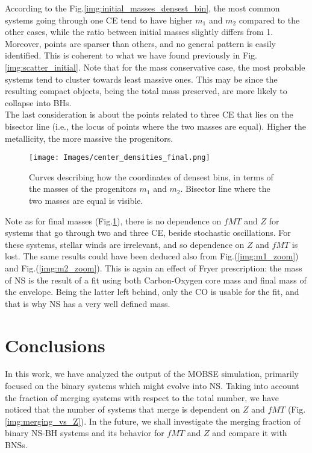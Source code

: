 \documentclass[preprint,12pt]{elsarticle}
\begin{document}
According to the Fig.\ref{img:initial_masses_densest_bin}, the most common systems going through one CE tend to have higher $m_1$ and $m_2$ compared to the other cases, while the ratio between initial masses slightly differs from 1. Moreover, points are sparser than others, and no general pattern is easily identified. This is coherent to what we have found previously in Fig.\ref{img:scatter_initial}. Note that for the mass conservative case, the most probable systems tend to cluster towards least massive ones. This may be since the resulting compact objects, being the total mass preserved, are more likely to collapse into BHs.\\

The last consideration is about the points related to three CE that lies on the bisector line (i.e., the locus of points where the two masses are equal). Higher the metallicity, the more massive the progenitors. 
\\
\begin{figure}[htp]
    \centering
    \texttt{[image: Images/center\_densities\_final.png]}
    \caption{Curves describing how the coordinates of densest bins, in terms of the masses of the progenitors $m_1$ and $m_2$. Bisector line where the two masses are equal is visible.}
    \label{img:final_masses_densest_bin}
  \end{figure}


Note as for final masses (Fig.\ref{img:final_masses_densest_bin}), there is no dependence on $fMT$ and $Z$ for systems that go through two and three CE, beside stochastic oscillations. For these systems, stellar winds are irrelevant, and so dependence on $Z$ and $fMT$ is lost. The same results could have been deduced also from Fig.(\ref{img:m1_zoom}) and Fig.(\ref{img:m2_zoom}). This is again an effect of Fryer prescription: the mass of NS is the result of a fit using both Carbon-Oxygen core mass and final mass of the envelope. Being the latter left behind, only the CO is usable for the fit, and that is why NS has a very well defined mass.\\

\newpage

\section{Conclusions}
In this work, we have analyzed the output of the MOBSE simulation, primarily focused on the binary systems which might evolve into NS. Taking into account the fraction of merging systems with respect to the total number, we have noticed that the number of systems that merge is dependent on $Z$ and $fMT$ (Fig.\ref{img:merging_vs_Z}). In the future, we shall investigate the merging fraction of binary NS-BH systems and its behavior for $fMT$ and $Z$ and compare it with BNSs.\\
\end{document}
